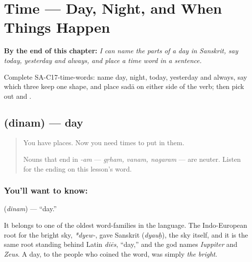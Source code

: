 
\chapter{Time --- Day, Night, and When Things Happen}
\label{ch:sa-time}

\begin{chapteropening}
\textbf{By the end of this chapter:} \emph{I can name the parts of a day in Sanskrit, say today, yesterday and always, and place a time word in a sentence.}

Complete SA-C17-time-words: name day, night, today, yesterday and always, say which three keep one shape, and place sadā on either side of the verb; then pick out  and .
\end{chapteropening}

\section[\texorpdfstring{\sk{दिनम्} (dinam)}{दिनम् (dinam)}]{ (dinam) — day}

\label{lesson:SA-C17-day}



\begin{quote}
You have places. Now you need times to put in them.

Nouns that end in \emph{-am} — \emph{gṛham, vanam, nagaram} — are neuter. Listen for the ending on this lesson's word.
\end{quote}

\subsection*{You'll want to know: }
\textbf{} (\emph{dinam}) — \textquotedblleft{}day.\textquotedblright{}

It belongs to one of the oldest word-families in the language. The Indo-European root for the bright sky, \emph{*dyew-}, gave Sanskrit \textbf{} (\emph{dyauḥ}), the sky itself, and it is the same root standing behind Latin \emph{diēs}, \textquotedblleft{}day,\textquotedblright{} and the god names \emph{Iuppiter} and \emph{Zeus}. A day, to the people who coined the word, was simply \emph{the bright}.

